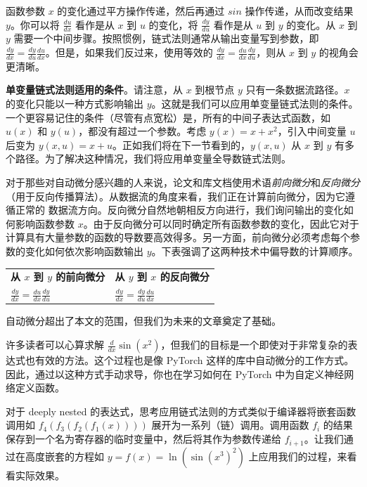 \documentclass[11pt]{article}
\begin{document}
函数参数 $x$ 的变化通过平方操作传递，然后再通过 $sin$ 操作传递，从而改变结果 $y$。你可以将 $\frac{du}{dx}$ 看作是从 $x$ 到 $u$ 的变化，将 $\frac{dy}{du}$ 看作是从 $u$ 到 $y$ 的变化。从 $x$ 到 $y$ 需要一个中间步骤。按照惯例，链式法则通常从输出变量写到参数，即 $\frac{dy}{dx} = \frac{dy}{du} \frac{du}{dx}$。但是，如果我们反过来，使用等效的 $\frac{dy}{dx} = \frac{du}{dx}\frac{dy}{du}$，则从 $x$ 到 $y$ 的视角会更清晰。

{\bf 单变量链式法则适用的条件}。请注意，从 $x$ 到根节点 $y$ 只有一条数据流路径。$x$ 的变化只能以一种方式影响输出 $y$。这就是我们可以应用单变量链式法则的条件。一个更容易记住的条件（尽管有点宽松）是，所有的中间子表达式函数，如 $u(x)$ 和 $y(u)$，都没有超过一个参数。考虑 $y(x) = x + x^2$，引入中间变量 $u$ 后变为 $y(x,u) = x + u$。正如我们将在下一节看到的，$y(x,u)$ 从 $x$ 到 $y$ 有多个路径。为了解决这种情况，我们将应用单变量全导数链式法则。

对于那些对自动微分感兴趣的人来说，论文和库文档使用术语{\em 前向微分}和{\em 反向微分}（用于反向传播算法）。从数据流的角度来看，我们正在计算前向微分，因为它遵循正常的 数据流方向。反向微分自然地朝相反方向进行，我们询问输出的变化如何影响函数参数 $x$。由于反向微分可以同时确定所有函数参数的变化，因此它对于计算具有大量参数的函数的导数要高效得多。另一方面，前向微分必须考虑每个参数的变化如何依次影响函数输出 $y$。下表强调了这两种技术中偏导数的计算顺序。

\begin{tabular}{ll}
{\bf 从 $x$ 到 $y$ 的前向微分} & {\bf 从 $y$ 到 $x$ 的反向微分} \\
$\frac{dy}{dx} = \frac{du}{dx}\frac{dy}{du}$ & $\frac{dy}{dx} = \frac{dy}{du} \frac{du}{dx}$ \\
\end{tabular}

自动微分超出了本文的范围，但我们为未来的文章奠定了基础。

许多读者可以心算求解 $\frac{d}{dx}\sin(x^2)$，但我们的目标是一个即使对于非常复杂的表达式也有效的方法。这个过程也是像 PyTorch 这样的库中自动微分的工作方式。因此，通过以这种方式手动求导，你也在学习如何在 PyTorch 中为自定义神经网络定义函数。

对于 deeply nested 的表达式，思考应用链式法则的方式类似于编译器将嵌套函数调用如 $f_4(f_3(f_2(f_1(x))))$ 展开为一系列（链）调用。调用函数 $f_i$ 的结果保存到一个名为寄存器的临时变量中，然后将其作为参数传递给 $f_{i+1}$。让我们通过在高度嵌套的方程如 $y = f(x) = \ln(\sin(x^3)^2)$ 上应用我们的过程，来看看实际效果。
\end{document}
